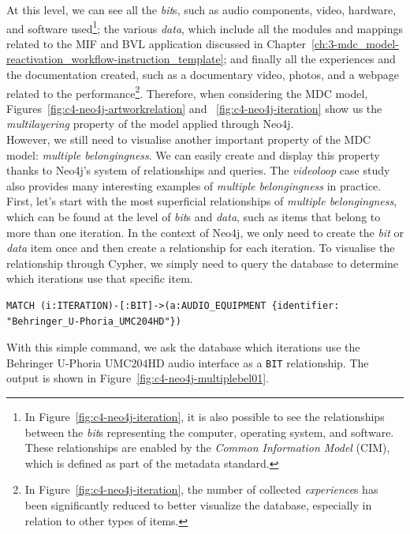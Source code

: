 At this level, we can see all the \textit{bit}s, such as audio components, video, hardware, and software used\footnote{In Figure~\ref{fig:c4-neo4j-iteration}, it is also possible to see the relationships between the \textit{bit}s representing the computer, operating system, and software. These relationships are enabled by the \textit{Common Information Model} (CIM), which is defined as part of the metadata standard.}; the various \textit{data}, which include all the modules and mappings related to the MIF and BVL application discussed in Chapter~\ref{ch:3-mdc_model-reactivation_workflow-instruction_template}; and finally all the experiences and the documentation created, such as a documentary video, photos, and a webpage related to the performance\footnote{In Figure~\ref{fig:c4-neo4j-iteration}, the number of collected \textit{experience}s has been significantly reduced to better visualize the database, especially in relation to other types of items.}. Therefore, when considering the MDC model, Figures~\ref{fig:c4-neo4j-artworkrelation} and ~\ref{fig:c4-neo4j-iteration} show us the \textit{multilayering} property of the model applied through Neo4j.\\
However, we still need to visualise another important property of the MDC model: \textit{multiple belongingness}. We can easily create and display this property thanks to Neo4j’s system of relationships and queries. The \textit{videoloop} case study also provides many interesting examples of \textit{multiple belongingness} in practice.\\
First, let’s start with the most superficial relationships of \textit{multiple belongingness}, which can be found at the level of \textit{bit}s and \textit{data}, such as items that belong to more than one iteration. In the context of Neo4j, we only need to create the \textit{bit} or \textit{data} item once and then create a relationship for each iteration. To visualise the relationship through Cypher, we simply need to query the database to determine which iterations use that specific item.\\
\begin{lstlisting}[style=cypher]
MATCH (i:ITERATION)-[:BIT]->(a:AUDIO_EQUIPMENT {identifier: "Behringer_U-Phoria_UMC204HD"})
\end{lstlisting}
With this simple command, we ask the database which iterations use the Behringer U-Phoria UMC204HD audio interface as a \texttt{BIT} relationship. The output is shown in Figure~\ref{fig:c4-neo4j-multiplebel01}.

